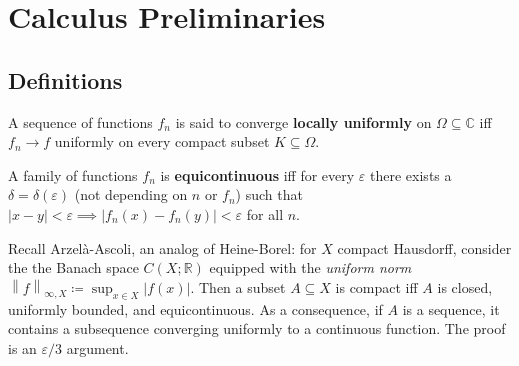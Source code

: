 \hypertarget{calculus-preliminaries}{%
\section{Calculus Preliminaries}\label{calculus-preliminaries}}

\hypertarget{definitions}{%
\subsection{Definitions}\label{definitions}}

\begin{definition}

A sequence of functions \(f_n\) is said to converge \textbf{locally
uniformly} on \(\Omega \subseteq {\mathbb{C}}\) iff \(f_n\to f\)
uniformly on every compact subset \(K \subseteq \Omega\).

\end{definition}

\begin{definition}

A family of functions \(f_n\) is \textbf{equicontinuous} iff for every
\({\varepsilon}\) there exists a \(\delta = \delta({\varepsilon})\) (not
depending on \(n\) or \(f_n\)) such that
\({\left\lvert {x-y} \right\rvert}<{\varepsilon}\implies {\left\lvert {f_n(x) - f_n(y)} \right\rvert} < {\varepsilon}\)
for all \(n\).

\end{definition}

\begin{remark}

Recall Arzelà-Ascoli, an analog of Heine-Borel: for \(X\) compact
Hausdorff, consider the the Banach space \(C(X; {\mathbb{R}})\) equipped
with the \emph{uniform norm}
\({\left\lVert {f} \right\rVert}_{\infty, X} \coloneqq\sup_{x\in X} {\left\lvert {f(x)} \right\rvert}\).
Then a subset \(A \subseteq X\) is compact iff \(A\) is closed,
uniformly bounded, and equicontinuous. As a consequence, if \(A\) is a
sequence, it contains a subsequence converging uniformly to a continuous
function. The proof is an \({\varepsilon}/3\) argument.

\end{remark}

\begin{definition}

\end{definition}

